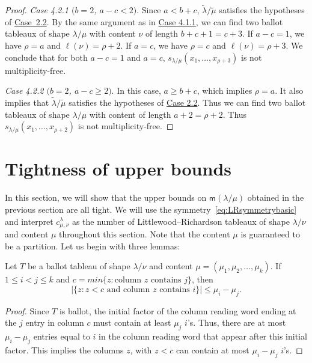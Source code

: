 \documentclass[ALCO,ThmDefs,Unicode,epreuves]{cedram}
\newcommand{\msf}{\mathsf{m}}
\let\hypertargeta\hypertarget %
\let\hyperlinka\hyperlink %
\newenvironment{Case}[1]{\par\vskip2pt\noindent%
\emph{#1}.}{\vskip2pt}
\begin{document}
\begin{proof}
\begin{Case}
{\hypertargeta{theo3.13_case4.2.1}{Case 4.2.1} $(b=2$, $a-c < 2)$} 
Since $a<b+c$, $\tilde\lambda/\tilde\mu$ satisfies the hypotheses of \hyperlinka{theo3.13_case2.2}{Case~2.2}. By the same argument as in \hyperlinka{theo3.13_case4.1.1}{Case 4.1.1}, we can find two ballot tableaux of shape $\lambda / \mu$ with content $\nu$ of length $b + c + 1 = c + 3$. If $a-c=1$, we have $\rho = a$ and $\ell(\nu) = \rho + 2$. If $a = c$, we have $\rho = c$ and $\ell(\nu) = \rho + 3$. We conclude that for both $a-c=1$ and $a=c$, $s_{\lambda/\mu}(x_1,\ldots,x_{\rho+3})$ is not multiplicity-free.
\end{Case}

\begin{Case}
{\hypertargeta{theo3.13_case4.2.2}{Case 4.2.2} $(b=2$, $a-c\geq 2)$} 
In this case, $a\geq b+c$, which implies $\rho = a$. It also implies that $\tilde\lambda/\tilde\mu$ satisfies the hypotheses of \hyperlinka{theo3.13_case2.2}{Case 2.2}. Thus we can find two ballot tableaux of shape $\lambda / \mu$ with content of length $a + 2 = \rho + 2$. Thus $s_{\lambda/\mu}(x_1,\ldots,x_{\rho+2})$ is not multiplicity-free.\qedhere
\end{Case}
\end{proof}

\section{Tightness of upper bounds}

In this section, we will show that the upper bounds on $\msf (\lambda/\mu)$ obtained in the previous section are all tight. We will use the symmetry~\eqref{eq:LRsymmetrybasic} and interpret $c^{\lambda}_{\mu,\nu}$ as the number of Littlewood--Richardson tableaux of shape $\lambda/\nu$ and content $\mu$ throughout this section. Note that the content $\mu$ is guaranteed to be a partition. Let us begin with three lemmas:

\begin{lemma}\label{Lemma:basicballot}
Let $T$ be a ballot tableau of shape $\lambda/\nu$ and content $\mu = (\mu_1,\mu_2,\ldots,\mu_k)$. If $1\leq i<j\leq k$ and $c = min\{ z : \text{column $z$ contains $j$} \}$, then 
\[
|\{ z : z < c\text{ and column $z$ contains $i$} \}| \leq \mu_i-\mu_j.
\]
 \end{lemma}
\begin{proof}
Since $T$ is ballot, the initial factor of the column reading word ending at the $j$ entry in column $c$ must contain at least $\mu_j$ $i$'s. Thus, there are at most $\mu_i-\mu_j$ entries equal to $i$ in the column reading word that appear after this initial factor. This implies the columns $z$, with $z < c$ can contain at most $\mu_i-\mu_j$ $i$'s.
\end{proof}
\end{document}
